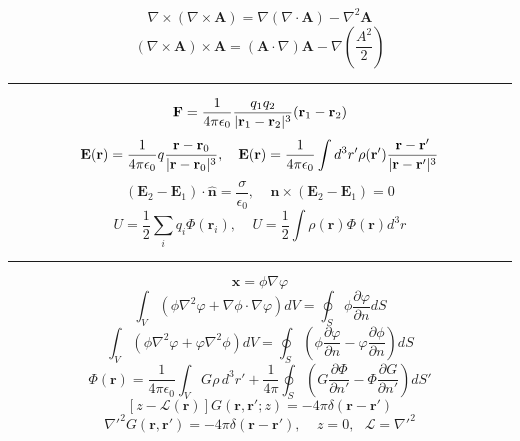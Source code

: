 \documentclass[twocolumn]{article}
\newcommand{\0}{\textcolor{gray}{0}}
\newcommand{\gr}{\nabla}
\newcommand{\di}{\nabla\cdot}
\newcommand{\ro}{\nabla\times}
\newcommand{\la}{\nabla^2}
\newcommand{\rv}{\mathbf{r}}
\newcommand{\eo}{\epsilon_{0}}
\newcommand{\rdif}{\rv - \rv'}
\newcommand{\n}[1]{\mathbf{#1}}
\begin{document}
\begin{equation*}
	\ro(\ro \n{A}) = \gr (\di \n{A}) - \la \n{A}
\end{equation*}
\begin{equation*}
	(\ro\n{A})\times\n{A} = (\n{A}\cdot\gr)\n{A} - \gr\left(\frac{A^2}{2}\right)
\end{equation*}
\vspace{-2mm}\hrule\vspace{1mm}
\begin{equation*}
	\n{F} = \ke\frac{q_1q_2}{|\rv_1 - \rv_2|^3}(\rv_1 - \rv_2)
\end{equation*}
\begin{equation*}
	\mathbf{E}(\rv) = \ke q\frac{\rv - \rv_0}{|\rv - \rv_0|^3}, ~~~ \mathbf{E}(\rv) = \ke \int d^3r'\rho(\rv')\frac{\rdif}{|\rdif|^3}
\end{equation*}
\begin{equation*}
	(\mathbf{E}_2 - \mathbf{E}_1)\cdot\hat{\mathbf{n}} = \frac{\sigma}{\eo}, ~~~~~ \hat{\mathbf{n}}\times(\mathbf{E}_2 - \mathbf{E}_1) = 0
\end{equation*}
\begin{equation*}
	U = \frac{1}{2}\sum_{i}q_i\Phi(\rv_i), ~~~~~ U = \frac{1}{2}\int\rho(\rv)\Phi(\rv)d^3r
\end{equation*}
\vspace{-2mm}\hrule\vspace{1mm}
\begin{equation*}
	\n{x} = \phi\gr\varphi
\end{equation*}
\begin{equation*}
	\int_{V}(\phi\la\varphi + \gr\phi\cdot\gr\varphi)dV = \oint_{S}\phi\frac{\partial\varphi}{\partial n}dS
\end{equation*}
\begin{equation*}
	\int_{V}(\phi\la\varphi + \varphi\la\phi)dV = \oint_{S}\left(\phi\frac{\partial\varphi}{\partial n} - \varphi\frac{\partial\phi}{\partial n}\right)dS
\end{equation*}
\begin{equation*}
	\Phi(\rv) = \frac{1}{4\pi\eo}\int_{V}G\rho\, d^3r' + \frac{1}{4\pi}\oint_{S}\left( G\frac{\partial\Phi}{\partial n'} - \Phi\frac{\partial G}{\partial n'} \right)dS'
\end{equation*}
\begin{equation*}
	\left[z - \mathcal{L}(\rv)\right] G(\rv,\rv'; z) = -4 \pi \delta(\rdif)
\end{equation*}
\begin{equation*}
	\nabla'^2 G(\rv,\rv') = -4 \pi \delta(\rdif), ~~~~~ z = 0, ~~~ \mathcal{L} = \nabla'^2
\end{equation*}
\end{document}
